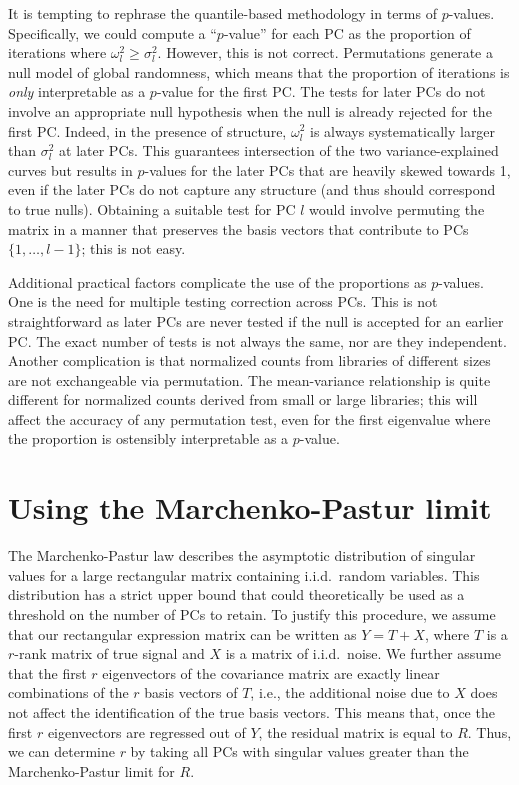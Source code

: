 \documentclass{article}
\begin{document}
It is tempting to rephrase the quantile-based methodology in terms of $p$-values. 
Specifically, we could compute a ``$p$-value'' for each PC as the proportion of iterations where $\omega^2_l \ge \sigma^2_l$.
However, this is not correct.
Permutations generate a null model of global randomness, which means that the proportion of iterations is \textit{only} interpretable as a $p$-value for the first PC.
The tests for later PCs do not involve an appropriate null hypothesis when the null is already rejected for the first PC.
Indeed, in the presence of structure, $\omega^2_l$ is always systematically larger than $\sigma^2_l$ at later PCs.
This guarantees intersection of the two variance-explained curves but results in $p$-values for the later PCs that are heavily skewed towards 1, 
even if the later PCs do not capture any structure (and thus should correspond to true nulls).
Obtaining a suitable test for PC $l$ would involve permuting the matrix in a manner that preserves the basis vectors that contribute to PCs $\{1, \ldots, l-1\}$; this is not easy.

Additional practical factors complicate the use of the proportions as $p$-values.
One is the need for multiple testing correction across PCs.
This is not straightforward as later PCs are never tested if the null is accepted for an earlier PC.
The exact number of tests is not always the same, nor are they independent. 
Another complication is that normalized counts from libraries of different sizes are not exchangeable via permutation.
The mean-variance relationship is quite different for normalized counts derived from small or large libraries; 
this will affect the accuracy of any permutation test, even for the first eigenvalue where the proportion is ostensibly interpretable as a $p$-value.

\section{Using the Marchenko-Pastur limit}
The Marchenko-Pastur law describes the asymptotic distribution of singular values for a large rectangular matrix containing i.i.d.\ random variables.
This distribution has a strict upper bound that could theoretically be used as a threshold on the number of PCs to retain.
To justify this procedure, we assume that our rectangular expression matrix can be written as $Y = T + X$, 
where $T$ is a $r$-rank matrix of true signal and $X$ is a matrix of i.i.d.\ noise.
We further assume that the first $r$ eigenvectors of the covariance matrix are exactly linear combinations of the $r$ basis vectors of $T$,
i.e., the additional noise due to $X$ does not affect the identification of the true basis vectors.
This means that, once the first $r$ eigenvectors are regressed out of $Y$, the residual matrix is equal to $R$.
Thus, we can determine $r$ by taking all PCs with singular values greater than the Marchenko-Pastur limit for $R$.
\end{document}
